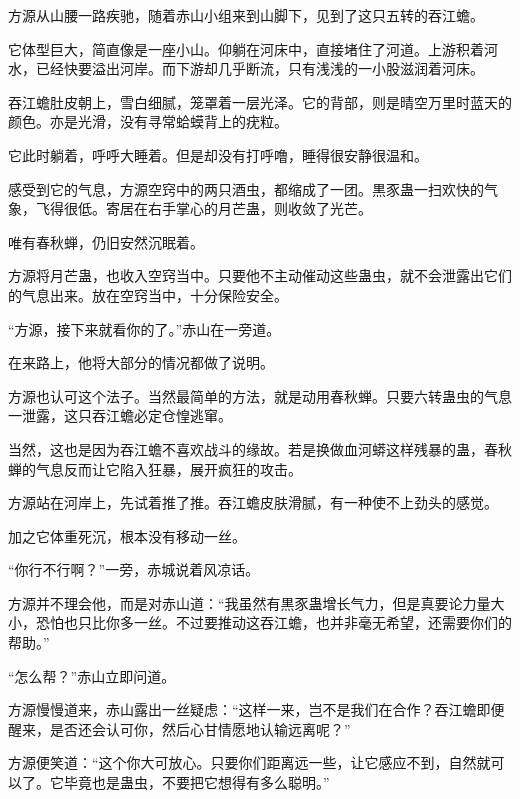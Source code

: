 \begin{this_body}
方源从山腰一路疾驰，随着赤山小组来到山脚下，见到了这只五转的吞江蟾。

它体型巨大，简直像是一座小山。仰躺在河床中，直接堵住了河道。上游积着河水，已经快要溢出河岸。而下游却几乎断流，只有浅浅的一小股滋润着河床。

吞江蟾肚皮朝上，雪白细腻，笼罩着一层光泽。它的背部，则是晴空万里时蓝天的颜色。亦是光滑，没有寻常蛤蟆背上的疣粒。

它此时躺着，呼呼大睡着。但是却没有打呼噜，睡得很安静很温和。

感受到它的气息，方源空窍中的两只酒虫，都缩成了一团。黒豕蛊一扫欢快的气象，飞得很低。寄居在右手掌心的月芒蛊，则收敛了光芒。

唯有春秋蝉，仍旧安然沉眠着。

方源将月芒蛊，也收入空窍当中。只要他不主动催动这些蛊虫，就不会泄露出它们的气息出来。放在空窍当中，十分保险安全。

“方源，接下来就看你的了。”赤山在一旁道。

在来路上，他将大部分的情况都做了说明。

方源也认可这个法子。当然最简单的方法，就是动用春秋蝉。只要六转蛊虫的气息一泄露，这只吞江蟾必定仓惶逃窜。

当然，这也是因为吞江蟾不喜欢战斗的缘故。若是换做血河蟒这样残暴的蛊，春秋蝉的气息反而让它陷入狂暴，展开疯狂的攻击。

方源站在河岸上，先试着推了推。吞江蟾皮肤滑腻，有一种使不上劲头的感觉。

加之它体重死沉，根本没有移动一丝。

“你行不行啊？”一旁，赤城说着风凉话。

方源并不理会他，而是对赤山道：“我虽然有黒豕蛊增长气力，但是真要论力量大小，恐怕也只比你多一丝。不过要推动这吞江蟾，也并非毫无希望，还需要你们的帮助。”

“怎么帮？”赤山立即问道。

方源慢慢道来，赤山露出一丝疑虑：“这样一来，岂不是我们在合作？吞江蟾即便醒来，是否还会认可你，然后心甘情愿地认输远离呢？”

方源便笑道：“这个你大可放心。只要你们距离远一些，让它感应不到，自然就可以了。它毕竟也是蛊虫，不要把它想得有多么聪明。”

\end{this_body}

